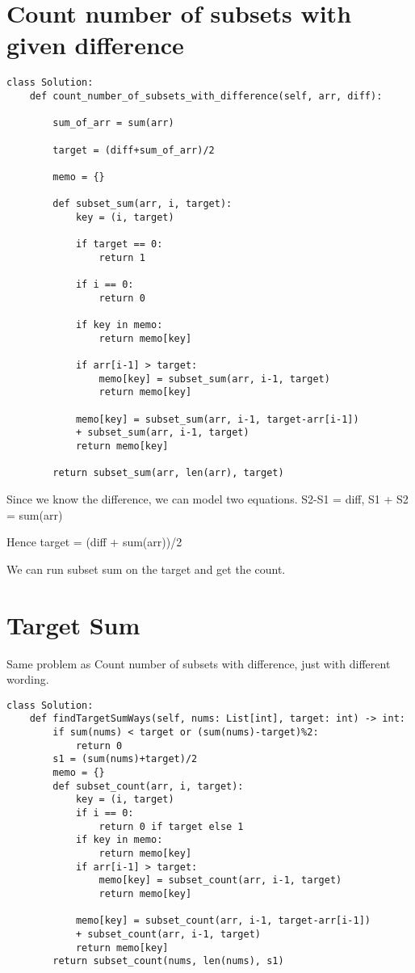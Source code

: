 \documentclass[24pt, a4]{article}
\begin{document}
\section{Count number of subsets with given difference}
\begin{lstlisting}
class Solution:
    def count_number_of_subsets_with_difference(self, arr, diff):

        sum_of_arr = sum(arr)

        target = (diff+sum_of_arr)/2

        memo = {}

        def subset_sum(arr, i, target):
            key = (i, target)

            if target == 0:
                return 1

            if i == 0:
                return 0

            if key in memo:
                return memo[key]

            if arr[i-1] > target:
                memo[key] = subset_sum(arr, i-1, target)
                return memo[key]

            memo[key] = subset_sum(arr, i-1, target-arr[i-1]) 
            + subset_sum(arr, i-1, target)
            return memo[key]

        return subset_sum(arr, len(arr), target)
\end{lstlisting}

Since we know the difference, we can model two equations. S2-S1 = diff, S1 + S2 = sum(arr)

Hence target = (diff + sum(arr))/2

We can run subset sum on the target and get the count.

\newpage
\section{Target Sum}

Same problem as Count number of subsets with difference, just with different wording.

\begin{lstlisting}
class Solution:
    def findTargetSumWays(self, nums: List[int], target: int) -> int:
        if sum(nums) < target or (sum(nums)-target)%2:
            return 0
        s1 = (sum(nums)+target)/2
        memo = {}
        def subset_count(arr, i, target):
            key = (i, target)
            if i == 0:
                return 0 if target else 1
            if key in memo:
                return memo[key]
            if arr[i-1] > target:
                memo[key] = subset_count(arr, i-1, target)
                return memo[key]
            
            memo[key] = subset_count(arr, i-1, target-arr[i-1]) 
            + subset_count(arr, i-1, target)
            return memo[key]
        return subset_count(nums, len(nums), s1)
\end{lstlisting}
\end{document}
